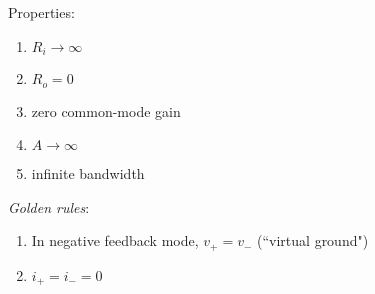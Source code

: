 \begin{CheatsheetEntryFrame}
    Properties:
    \begin{enumerate}
        \item $R_i \to \infty$ 
        \item $R_o = 0$ 
        \item zero common-mode gain 
        \item $A \to \infty$ 
        \item infinite bandwidth
    \end{enumerate}

    \emph{Golden rules}:
    \begin{enumerate}
        \item In negative feedback mode, $v_+ = v_-$ (``virtual ground")
        \item $i_+ = i_- = 0$
    \end{enumerate}
\end{CheatsheetEntryFrame}

\newpage

